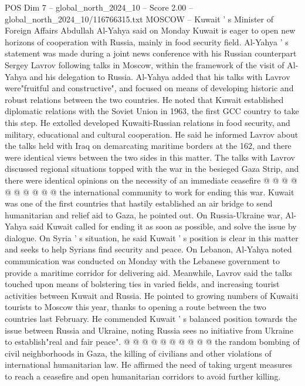 \begin{textsample}{POS Dim 7 – global\_north\_2024\_10 – Score 2.00 – global\_north\_2024\_10/116766315.txt}  \label{ex:f7_pos_413}
MOSCOW -- Kuwait ' s Minister of Foreign Affairs Abdullah Al-Yahya said on Monday Kuwait is eager to open new horizons of cooperation with Russia, mainly in food security field.
Al-Yahya ' s statement was made during a joint news conference with his Russian counterpart Sergey Lavrov following talks in Moscow, within the framework of the visit of Al-Yahya and his delegation to Russia.
Al-Yahya added that his talks with Lavrov were"fruitful and constructive", and focused on means of developing historic and robust relations between the two countries.
He noted that Kuwait established diplomatic relations with the Soviet Union in 1963, the first GCC country to take this step.
He extolled developed Kuwaiti-Russian relations in food security, and military, educational and cultural cooperation.
He said he informed Lavrov about the talks held with Iraq on demarcating maritime borders at the 162, and there were identical views between the two sides in this matter.
The talks with Lavrov discussed regional situations topped with the war in the besieged Gaza Strip, and there were identical opinions on the necessity of an immediate ceasefire @ @ @ @ @ @ @ @ @ @ the international community to work for ending this war.
Kuwait was one of the first countries that hastily established an air bridge to send humanitarian and relief aid to Gaza, he pointed out.
On Russia-Ukraine war, Al-Yahya said Kuwait called for ending it as soon as possible, and solve the issue by dialogue.
On Syria ' s situation, he said Kuwait ' s position is clear in this matter and seeks to help Syrians find security and peace.
On Lebanon, Al-Yahya noted communication was conducted on Monday with the Lebanese government to provide a maritime corridor for delivering aid.
Meanwhile, Lavrov said the talks touched upon means of bolstering ties in varied fields, and increasing tourist activities between Kuwait and Russia.
He pointed to growing numbers of Kuwaiti tourists to Moscow this year, thanks to opening a route between the two countries last February.
He commended Kuwait ' s balanced position towards the issue between Russia and Ukraine, noting Russia sees no initiative from Ukraine to establish"real and fair peace". @ @ @ @ @ @ @ @ @ @ the random bombing of civil neighborhoods in Gaza, the killing of civilians and other violations of international humanitarian law.
He affirmed the need of taking urgent measures to reach a ceasefire and open humanitarian corridors to avoid further killing.

\end{textsample}
